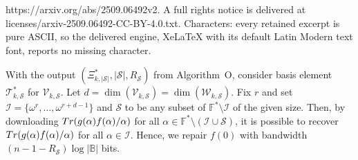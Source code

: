 \documentclass[10pt,a4paper]{amsart}
\newcommand{\BB}{\mathbb{B}}
\newcommand{\FF}{\mathbb{F}}
\newcommand{\cI}{\mathcal{I}}
\newcommand{\cS}{\mathscr{S}}
\newcommand{\cT}{\mathcal{T}}
\newcommand{\cV}{\mathcal{V}}
\newcommand{\cW}{\mathcal{W}}
\newcommand{\tr}{{\rm Tr}}
\begin{document}
https://arxiv.org/abs/2509.06492v2. A full rights notice is delivered at licenses/arxiv-2509.06492-CC-BY-4.0.txt. Characters: every retained excerpt is pure ASCII, so the delivered engine, XeLaTeX with its default Latin Modern text font, reports no missing character.
\begin{corollary}\label{cor:nodes_to_download}
    With the output $(\Xi_{k,|\cS|}^*,|\cS|,R_{\cS})$ from Algorithm~O, consider basis element $\cT_{k,\cS}^*$ for $\cV_{k,\cS}$. Let $d = \dim(\cV_{k,\cS}) = \dim(\cW_{k,\cS})$. Fix $r$ and set $\cI = \{\omega^r,\ldots,\omega^{r+d-1}\}$ and $\cS$ to be any subset of $\FF^*\setminus\cI$ of the given size. Then, by downloading $\tr(g(\alpha)f(\alpha)/\alpha)$ for all $\alpha\in\FF^*\setminus(\cI\cup\cS)$, it is possible to recover $\tr(g(\alpha)f(\alpha)/\alpha)$ for all $\alpha\in\cI$. 
    Hence, we repair $f(0)$ with bandwidth $(n-1-R_\cS)\log|\BB|$ bits.
\end{corollary}
\end{document}
